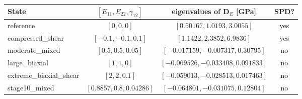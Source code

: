 \begin{tabular}{l c c c}
\toprule
State & $[E_{11},E_{22},\gamma_{12}]$ & eigenvalues of $\mathbf{D}_E$ [GPa] & SPD? \\
\midrule
reference & $[0, 0, 0]$ & $[0.50167, 1.0193, 3.0055]$ & yes \\
compressed\_shear & $[-0.1, -0.1, 0.1]$ & $[1.1422, 2.3852, 6.9836]$ & yes \\
moderate\_mixed & $[0.5, 0.5, 0.05]$ & $[-0.017159, -0.007317, 0.30795]$ & no \\
large\_biaxial & $[1, 1, 0]$ & $[-0.069526, -0.033408, 0.091833]$ & no \\
extreme\_biaxial\_shear & $[2, 2, 0.1]$ & $[-0.059013, -0.028513, 0.017463]$ & no \\
stage10\_mixed & $[0.8857, 0.8, 0.04286]$ & $[-0.064801, -0.031075, 0.12804]$ & no \\
\bottomrule
\end{tabular}
